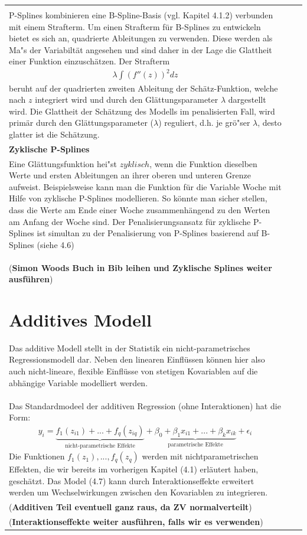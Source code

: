 \documentclass[11pt,a4paper]{report}
\begin{document}
\begin{table}
\begin{tabular}{p{3cm}|p{5cm}|p{4cm}}
\begin{document}
	\noindent\textbf{P-Splines basierend auf B-Splines} \\
	P-Splines kombinieren eine B-Spline-Basis (vgl. Kapitel 4.1.2) verbunden mit einem Strafterm. Um einen Strafterm für B-Splines zu entwickeln bietet es sich an, quadrierte Ableitungen zu verwenden. Diese werden als Ma"s der Variabiltät angesehen und sind daher in der Lage die Glattheit einer Funktion einzuschätzen.
	Der Strafterm 
	\begin{align}
	\lambda\int(f''(z))^2dz
	\end{align}
	beruht auf der quadrierten zweiten Ableitung der Schätz-Funktion, welche nach $z$ integriert wird und durch den Glättungsparameter $\lambda$ dargestellt wird. Die Glattheit der Schätzung des Modells im penalisierten Fall, wird primär durch den Glättungsparameter ($\lambda$) reguliert, d.h. je grö"ser $\lambda$, desto glatter ist die Schätzung.\\
	
	\noindent\textbf{Zyklische P-Splines} \\
	Eine Glättungsfunktion hei"st $zyklisch$, wenn die Funktion dieselben Werte und ersten Ableitungen an ihrer oberen und unteren Grenze aufweist. Beispielsweise kann man die Funktion für die Variable Woche mit Hilfe von zyklische P-Splines modellieren. So könnte man sicher stellen, dass die Werte am Ende einer Woche zusammenhängend zu den Werten am Anfang der Woche sind. Der Penalisierungsansatz für zyklische P-Splines ist simultan zu der Penalisierung von P-Splines basierend auf B-Splines (siehe 4.6) \\
	(\textbf{Simon Woods Buch in Bib leihen und Zyklische Splines weiter ausführen})
	
	
	\section{Additives Modell}
	Das additive Modell stellt in der Statistik ein nicht-parametrisches Regressionsmodell dar. Neben den linearen Einﬂüssen können hier also auch nicht-lineare, flexible Einflüsse von stetigen Kovariablen auf die abhängige Variable modelliert werden. \\
	Das Standardmodeel der additiven Regression (ohne Interaktionen) hat die Form:
	\begin{align} 
	y_{i}=\underbrace{f_{1}(z_{i1})+...+f_{q}(z_{iq})}_{\text{nicht-parametrische Effekte}}+\underbrace{\beta_{0}+\beta_{1}x_{i1}+...+\beta_{k}x_{ik}}_{\text{parametrische Effekte}}+\epsilon_{i}
	\end{align}
	Die Funktionen $f_{1}(z_{1}),...,f_{q}(z_{q})$ werden mit nichtparametrischen Effekten, die wir bereits im vorherigen Kapitel (4.1) erläutert haben, geschätzt. Das Model (4.7) kann durch Interaktionseffekte erweitert werden um Wechselwirkungen zwischen den Kovariablen zu integrieren.\\
	(\textbf{Additiven Teil eventuell ganz raus, da ZV normalverteilt}) \\
	(\textbf{Interaktionseffekte weiter ausführen, falls wir es verwenden})

\end{document}
\end{tabular}
\end{table}
\end{document}
